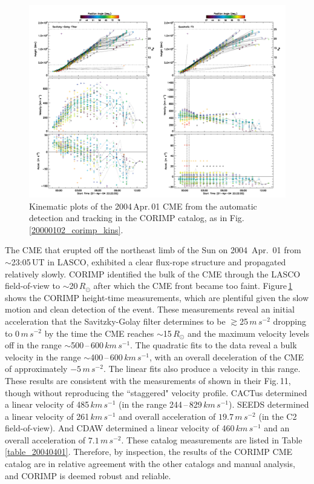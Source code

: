 \documentclass[referee,a4paper,12pt,traditabstract]{swsc}
\begin{document}
\begin{linenumbers}
\begin{figure}[t]
\centerline{\includegraphics[width=\linewidth]{images/20040401_corimp_kins.pdf}}
\caption{Kinematic plots of the 2004\,Apr.\,01 CME from the automatic detection and tracking in the CORIMP catalog, as in Fig.\,\ref{20000102_corimp_kins}.}
\label{20040401_corimp_kins}
\end{figure}

The CME that erupted off the northeast limb of the Sun on 2004~Apr.~01 from $\sim$23:05\,UT in LASCO, exhibited a clear flux-rope structure and propagated relatively slowly. CORIMP identified the bulk of the CME through the LASCO field-of-view to $\sim$20\,$R_\odot$ after which the CME front became too faint. Figure\,\ref{20040401_corimp_kins} shows the CORIMP height-time measurements, which are plentiful given the slow motion and clean detection of the event. These measurements reveal an initial acceleration that the Savitzky-Golay filter determines to be $\gtrsim$25\,$m\,s^{-2}$ dropping to 0\,$m\,s^{-2}$ by the time the CME reaches $\sim$15\,$R_\odot$ and the maximum velocity levels off in the range $\sim$500\,--\,600\,$km\,s^{-1}$. The quadratic fits to the data reveal a bulk velocity in the range $\sim$400\,--\,600\,$km\,s^{-1}$, with an overall deceleration of the CME of approximately $-5\,m\,s^{-2}$. The linear fits also produce a velocity in this range. These results are consistent with the measurements of \cite{2009A&A...495..325B} shown in their Fig.\,11, though without reproducing the ``staggered" velocity profile. CACTus determined a linear velocity of 485$\,km\,s^{-1}$ (in the range 244\,--\,829\,$km\,s^{-1}$). SEEDS determined a linear velocity of 261\,$km\,s^{-1}$ and overall acceleration of $19.7\,m\,s^{-2}$ (in the C2 field-of-view). And CDAW determined a linear velocity of 460$\,km\,s^{-1}$ and an overall acceleration of $7.1\,m\,s^{-2}$. These catalog measurements are listed in Table\,\ref{table_20040401}. Therefore, by inspection, the results of the CORIMP CME catalog are in relative agreement with the other catalogs and manual analysis, and CORIMP is deemed robust and reliable.



\end{linenumbers}
\end{document}
